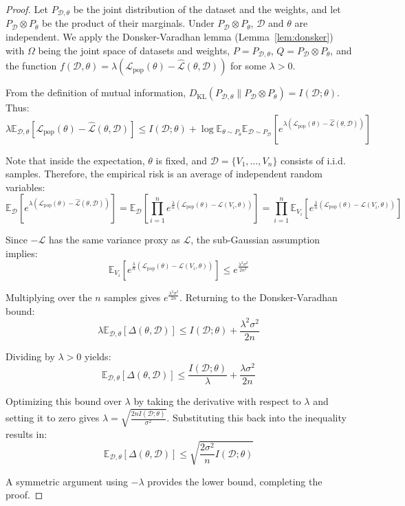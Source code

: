 \begin{proof}
Let $P_{\mathcal{D}, \theta}$ be the joint distribution of the dataset and the weights, and let $P_{\mathcal{D}} \otimes P_\theta$ be the product of their marginals. Under $P_{\mathcal{D}} \otimes P_\theta$, $\mathcal{D}$ and $\theta$ are independent.
We apply the Donsker-Varadhan lemma (Lemma~\ref{lem:donsker}) with $\Omega$ being the joint space of datasets and weights, $P = P_{\mathcal{D}, \theta}$, $Q = P_{\mathcal{D}} \otimes P_\theta$, and the function $f(\mathcal{D}, \theta) = \lambda \left( \mathcal{L}_{\text{pop}}(\theta) - \hat{\mathcal{L}}(\theta, \mathcal{D}) \right)$ for some $\lambda > 0$.

From the definition of mutual information, $D_{\text{KL}}(P_{\mathcal{D}, \theta} \parallel P_{\mathcal{D}} \otimes P_\theta) = I(\mathcal{D}; \theta)$. Thus:
\[ \lambda \mathbb{E}_{\mathcal{D}, \theta}[\mathcal{L}_{\text{pop}}(\theta) - \hat{\mathcal{L}}(\theta, \mathcal{D})] \leq I(\mathcal{D}; \theta) + \log \mathbb{E}_{\theta \sim P_\theta} \mathbb{E}_{\mathcal{D} \sim P_{\mathcal{D}}} \left[ e^{\lambda (\mathcal{L}_{\text{pop}}(\theta) - \hat{\mathcal{L}}(\theta, \mathcal{D}))} \right] \]

Note that inside the expectation, $\theta$ is fixed, and $\mathcal{D} = \{V_1, \dots, V_n\}$ consists of i.i.d. samples. Therefore, the empirical risk is an average of independent random variables:
\[ \mathbb{E}_{\mathcal{D}} \left[ e^{\lambda (\mathcal{L}_{\text{pop}}(\theta) - \hat{\mathcal{L}}(\theta, \mathcal{D}))} \right] = \mathbb{E}_{\mathcal{D}} \left[ \prod_{i=1}^n e^{\frac{\lambda}{n} (\mathcal{L}_{\text{pop}}(\theta) - \mathcal{L}(V_i, \theta))} \right] = \prod_{i=1}^n \mathbb{E}_{V_i} \left[ e^{\frac{\lambda}{n} (\mathcal{L}_{\text{pop}}(\theta) - \mathcal{L}(V_i, \theta))} \right] \]

Since $-\mathcal{L}$ has the same variance proxy as $\mathcal{L}$, the sub-Gaussian assumption implies:
\[ \mathbb{E}_{V_i} \left[ e^{\frac{\lambda}{n} (\mathcal{L}_{\text{pop}}(\theta) - \mathcal{L}(V_i, \theta))} \right] \leq e^{\frac{\lambda^2 \sigma^2}{2 n^2}} \]

Multiplying over the $n$ samples gives $e^{\frac{\lambda^2 \sigma^2}{2 n}}$. Returning to the Donsker-Varadhan bound:
\[ \lambda \mathbb{E}_{\mathcal{D}, \theta}[\Delta(\theta, \mathcal{D})] \leq I(\mathcal{D}; \theta) + \frac{\lambda^2 \sigma^2}{2n} \]

Dividing by $\lambda > 0$ yields:
\[ \mathbb{E}_{\mathcal{D}, \theta}[\Delta(\theta, \mathcal{D})] \leq \frac{I(\mathcal{D}; \theta)}{\lambda} + \frac{\lambda \sigma^2}{2n} \]

Optimizing this bound over $\lambda$ by taking the derivative with respect to $\lambda$ and setting it to zero gives $\lambda = \sqrt{\frac{2 n I(\mathcal{D}; \theta)}{\sigma^2}}$. Substituting this back into the inequality results in:
\[ \mathbb{E}_{\mathcal{D}, \theta}[\Delta(\theta, \mathcal{D})] \leq \sqrt{\frac{2 \sigma^2}{n} I(\mathcal{D}; \theta)} \]

A symmetric argument using $-\lambda$ provides the lower bound, completing the proof.
\end{proof}

